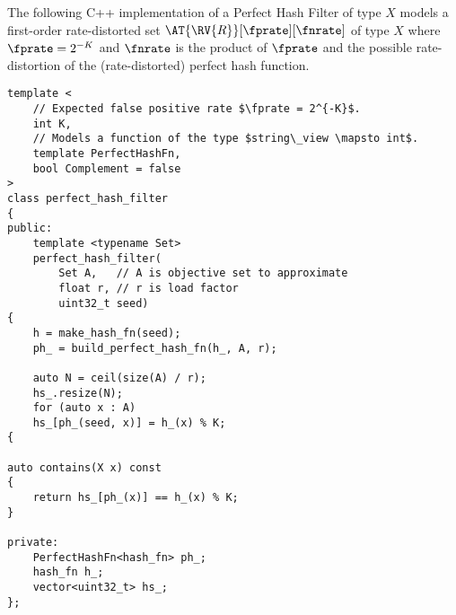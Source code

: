 \documentclass[ ../main.tex]{subfiles}
\begin{document}

The following C++ implementation of a Perfect Hash Filter of type $X$ models a first-order rate-distorted set $\AT{\RV{R}}[\fprate][\fnrate]$ of type $X$ where $\fprate = 2^{-K}$ and $\fnrate$ is the product of $\fprate$ and the possible rate-distortion of the (rate-distorted) perfect hash function.

%	
%
%	
%
%
%



\begin{verbatim}
template <
	// Expected false positive rate $\fprate = 2^{-K}$.
	int K,
	// Models a function of the type $string\_view \mapsto int$.
	template PerfectHashFn,
	bool Complement = false
>
class perfect_hash_filter
{
public:
	template <typename Set>
	perfect_hash_filter(
		Set A,   // A is objective set to approximate
		float r, // r is load factor
		uint32_t seed)
{
	h = make_hash_fn(seed);
	ph_ = build_perfect_hash_fn(h_, A, r);

	auto N = ceil(size(A) / r);	
	hs_.resize(N);
	for (auto x : A)
	hs_[ph_(seed, x)] = h_(x) % K;
{

auto contains(X x) const
{
	return hs_[ph_(x)] == h_(x) % K;
}

private:
	PerfectHashFn<hash_fn> ph_;
	hash_fn h_;
	vector<uint32_t> hs_;
};
\end{verbatim}
\end{document}
